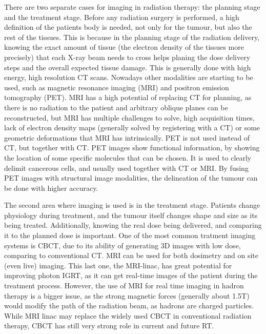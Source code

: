 There are two separate cases for imaging in radiation therapy: the planning stage and the treatment stage. Before any radiation surgery is performed, a high definition of the patients body is needed, not only for the tumour, but also the rest of the tissues. This is because in the planning stage of  the radiation delivery, knowing the exact amount of tissue (the electron density of the tissues more precisely) that each X-ray beam needs to cross helps planing the dose delivery steps and the overall expected tissue damage. This is generally done with high energy, high resolution CT scans. Nowadays other modalities are starting to be used, such as magnetic resonance imaging (MRI)\cite{schmidt2015radiotherapy} and positron emission tomography (PET). MRI has a high potential of replacing CT for planning, as there is no radiation to the patient and arbitrary oblique planes can be reconstructed, but MRI has multiple challenges to solve, high acquisition times, lack of electron density maps (generally solved by registering with a CT) or some geometric deformations that MRI has intrinsically. PET is not used instead of CT, but together with CT. PET images show functional information, by showing the location of some specific molecules that can be chosen. It is used to clearly delimit cancerous cells, and usually used together with CT\cite{soykut2013use} or MRI. By fusing PET images with structural image modalities, the delineation of the tumour can be done with higher accuracy. 

The second area where imaging is used is in the treatment stage. Patients change physiology during treatment, and the tumour itself changes shape and size as its being treated. Additionally, knowing the real dose being delivered, and comparing it to the planned dose is important. One of the most common tratment imaging systems is CBCT\cite{ding2007study}, due to its ability of generating 3D images with low dose, comparing to comventional CT. MRI can be used for both dosimetry\cite{ozenne2017improved} and on site (even live) imaging. This last one, the MRI-linac, has great potential for improving photon IGRT, as it can get real-time images of the patient during the treatment process\cite{LAGENDIJK200825}. However, the use of MRI for real time imaging in hadron therapy is a bigger issue, as the strong magnetic forces (generally about 1.5T) would modify the path of the radiation beam, as hadrons are charged particles. While MRI linac may replace the widely used CBCT in conventional radiation therapy, CBCT has still very strong role in current and future RT.


